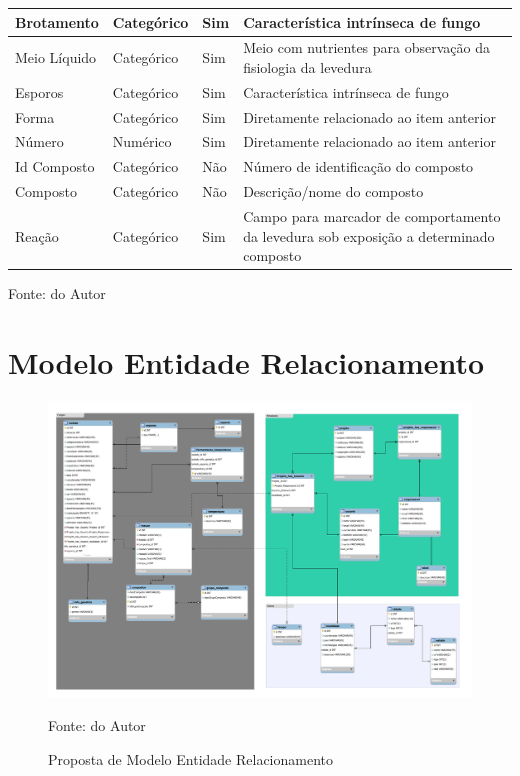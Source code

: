 \documentclass[tcc2]{classe_uftex/uftex}
\begin{document}
\begin{table}[hbt]
\begin{tabularx}{\textwidth}{l|l|l|X}
    \hline
    Brotamento & Categórico & Sim & Característica intrínseca de fungo \\
    \hline
    Meio Líquido & Categórico & Sim & Meio com nutrientes para observação da fisiologia da levedura \\
    \hline
    Esporos & Categórico & Sim & Característica intrínseca de fungo \\
    \hline
    Forma & Categórico & Sim & Diretamente relacionado ao item anterior \\
    \hline
    Número & Numérico & Sim & Diretamente relacionado ao item anterior \\
    \hline
    Id Composto & Categórico & Não & Número de identificação do composto  \\
    \hline
    Composto & Categórico & Não & Descrição/nome do composto \\
    \hline
    Reação & Categórico & Sim & Campo para marcador de comportamento da levedura sob exposição a determinado composto \\%
\bottomrule
\end{tabularx}
\raggedright \scriptsize \centering Fonte: do Autor
\end{table}

\chapter{Modelo Entidade Relacionamento}
\label{ape:modelo_er}

 \begin{figure}[ht]
    \centering
      \includegraphics[scale=0.4, angle=270]{TCC_Johnny/pdf/modelo_ER.pdf}
      \label{ape:modeloER}
      \caption{Proposta de Modelo Entidade Relacionamento}
       \raggedright \scriptsize \centering  Fonte: do Autor
    \end{figure}%
\end{document}
